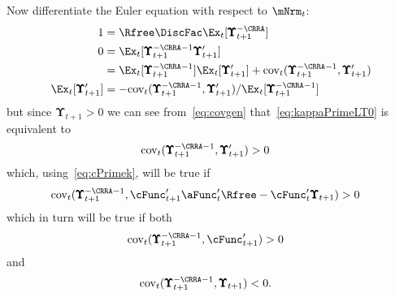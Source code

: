 \documentclass[\econtexRoot/BufferStockTheory]{subfiles}
\begin{document}
Now differentiate the Euler equation with respect to $\mNrm_{t}$:
\begin{equation}\label{eq:covgen}\begin{aligned}
  1  & = \Rfree \DiscFac \Ex_{t}[ \pmb{\Upsilon}_{t+1}^{-\CRRA}] 
  \\ 0  & = \Ex_{t}[\pmb{\Upsilon}_{t+1}^{-\CRRA-1} \pmb{\Upsilon}_{t+1}^{\prime}] 
  \\  & = \Ex_{t}[\pmb{\Upsilon}_{t+1}^{-\CRRA-1}]\Ex_{t}[\pmb{\Upsilon}_{t+1}^{\prime}]+\mbox{cov}_{t}(\pmb{\Upsilon}_{t+1}^{-\CRRA-1},\pmb{\Upsilon}_{t+1}^{\prime}) 
  \\ \Ex_{t}[\pmb{\Upsilon}_{t+1}^{\prime}]  & = -\mbox{cov}_{t}(\pmb{\Upsilon}_{t+1}^{-\CRRA-1},\pmb{\Upsilon}_{t+1}^{\prime})/\Ex_{t}[\pmb{\Upsilon}_{t+1}^{-\CRRA-1}] 
\end{aligned}\end{equation}
but since $\pmb{\Upsilon}_{t+1} > 0$ we can see from~\eqref{eq:covgen} that~\eqref{eq:kappaPrimeLT0} is equivalent to
\begin{equation}\begin{gathered}\begin{aligned}
  \mbox{cov}_{t}(\pmb{\Upsilon}_{t+1}^{-\CRRA-1},\pmb{\Upsilon}_{t+1}^{\prime})  & > 0 \nonumber
\end{aligned}\end{gathered}\end{equation}
which, using~\eqref{eq:cPrimek}, will be true if
\begin{equation}\begin{gathered}\begin{aligned}
  \mbox{cov}_{t}(\pmb{\Upsilon}_{t+1}^{-\CRRA-1},\cFunc^{\prime}_{t+1}\aFunc^{\prime}_{t}\Rfree - \cFunc^{\prime}_{t}\pmb{\Upsilon}_{t+1})  & > 0 \notag
\end{aligned}\end{gathered}\end{equation}
which in turn will be true if both
\begin{equation}\begin{gathered}\begin{aligned}
  \mbox{cov}_{t}(\pmb{\Upsilon}_{t+1}^{-\CRRA-1},\cFunc^{\prime}_{t+1} )  & > 0 \notag
\end{aligned}\end{gathered}\end{equation}
and
\begin{align*}
  \mbox{cov}_{t}(\pmb{\Upsilon}_{t+1}^{-\CRRA-1},\pmb{\Upsilon}_{t+1})  & < 0. \notag
\end{align*}
\end{document}
